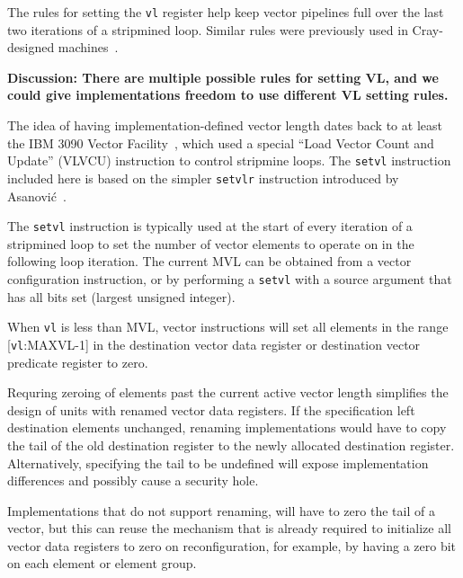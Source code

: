 \begin{commentary}
  The rules for setting the {\tt vl} register help keep vector
  pipelines full over the last two iterations of a stripmined loop.
  Similar rules were previously used in Cray-designed machines~\cite{crayx1asm}.

  {\bf Discussion: There are multiple possible rules for setting VL, and we could
  give implementations freedom to use different VL setting rules.}
\end{commentary}

\begin{commentary}
  The idea of having implementation-defined vector length dates back
  to at least the IBM 3090 Vector Facility~\cite{ibm370varch}, which
  used a special ``Load Vector Count and Update'' (VLVCU) instruction
  to control stripmine loops.  The {\tt setvl} instruction included
  here is based on the simpler {\tt setvlr} instruction introduced by
  Asanovi\'{c}~\cite{krstephd}.
\end{commentary}

The {\tt setvl} instruction is typically used at the start of every
iteration of a stripmined loop to set the number of vector elements to
operate on in the following loop iteration.  The current MVL can be
obtained from a vector configuration instruction, or by performing a
{\tt setvl} with a source argument that has all bits set (largest
unsigned integer).

When {\tt vl} is less than MVL, vector instructions will set all
elements in the range [{\tt vl}:MAXVL-1] in the destination vector
data register or destination vector predicate register to zero.

\begin{commentary}
  Requring zeroing of elements past the current active vector length
  simplifies the design of units with renamed vector data registers.
  If the specification left destination elements unchanged, renaming
  implementations would have to copy the tail of the old destination
  register to the newly allocated destination register.
  Alternatively, specifying the tail to be undefined will expose
  implementation differences and possibly cause a security hole.

  Implementations that do not support renaming, will have to zero the
  tail of a vector, but this can reuse the mechanism that is already
  required to initialize all vector data registers to zero on
  reconfiguration, for example, by having a zero bit on each element
  or element group.
\end{commentary}

